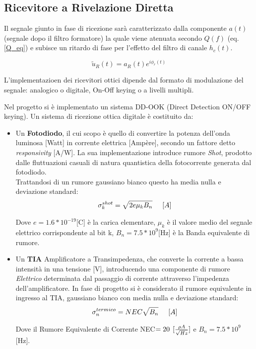 \documentclass[12pt, a4paper]{article}
\begin{document}

\subsection{Ricevitore a Rivelazione Diretta}
\label{sub:rice}


Il segnale giunto in fase di ricezione sarà caratterizzato dalla componente $a(t)$ (segnale dopo il filtro formatore)  la quale viene atenuata secondo $Q(f)$ (eq. \ref{Q_eq}) e subisce un ritardo di fase per l'effetto del filtro di canale $h_c(t)$.

\begin{equation}
	\tilde{u}_R(t) = a_R(t)e^{i\phi_r(t)}
\end{equation}

L'implementazioen dei ricevitori ottici dipende dal formato di modulazione del segnale: analogico o digitale, On-Off keying o a livelli multipli.

Nel progetto si è implementato un sistema DD-OOK (Direct Detection ON/OFF keying).
Un sistema di ricezione ottica digitale è costituito da:
\begin{itemize}
	\item Un \textbf{Fotodiodo}, il cui scopo è quello di convertire la potenza dell'onda luminosa [Watt] in corrente elettrica [Ampère], secondo un fattore detto \textit{responsivity} [A/W].
	La sua implementazione introduce rumore \textit{Shot}, prodotto dalle fluttuazioni casuali di natura quantistica della fotocorrente generata dal fotodiodo.\\
	Trattandosi di un rumore gaussiano bianco questo ha media nulla e deviazione standard:\\
	\begin{align*}
	\sigma_k^{shot} = \sqrt{2e\mu_kB_n}  \hspace{5mm}[A]
\end{align*}

	Dove $e = 1.6*10^{-19} $[C] è la carica elementare, $\mu_k$ è il valore medio del segnale elettrico corrispondente al bit k, $B_n =7.5 *10^9$[Hz] è la Banda equivalente di rumore.
	
	\item Un \textbf{TIA} Amplificatore a Transimpedenza, che converte la corrente a bassa intensità in una tensione [V], introducendo una componente di rumore \textit{Elettrico} determinata dal passaggio di corrente attraverso l'impedenza dell'amplificatore.
	In fase di progetto si è considerato il rumore equivalente in ingresso al TIA, gaussiano bianco con media nulla e deviazione standard:
	\begin{align*}
	\sigma_n^{termico} = NEC\sqrt{B_n} \hspace{5mm} [A]
\end{align*}

	Dove il Rumore Equivalente di Corrente NEC$=20 \hspace{1.5mm}[\frac{\rho A}{\sqrt{Hz}}]$  e $B_n = 7.5 *10^9$[Hz].
	
\end{itemize}
\end{document}
